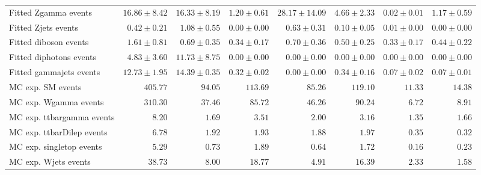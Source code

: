 \begin{table}
\begin{center}
{\begin{tabular*}{\textwidth}{@{\extracolsep{\fill}}lrrrrrrr}
        Fitted Zgamma events         & $16.86 \pm 8.42$          & $16.33 \pm 8.19$          & $1.20 \pm 0.61$          & $28.17 \pm 14.09$          & $4.66 \pm 2.33$          & $0.02 \pm 0.01$          & $1.17 \pm 0.59$              \\
        Fitted Zjets events         & $0.42 \pm 0.21$          & $1.08 \pm 0.55$          & $0.00 \pm 0.00$          & $0.63 \pm 0.31$          & $0.10 \pm 0.05$          & $0.01 \pm 0.00$          & $0.00 \pm 0.00$              \\
        Fitted diboson events         & $1.61 \pm 0.81$          & $0.69 \pm 0.35$          & $0.34 \pm 0.17$          & $0.70 \pm 0.36$          & $0.50 \pm 0.25$          & $0.33 \pm 0.17$          & $0.44 \pm 0.22$              \\
        Fitted diphotons events         & $4.83 \pm 3.60$          & $11.73 \pm 8.75$          & $0.00 \pm 0.00$          & $0.00 \pm 0.00$          & $0.00 \pm 0.00$          & $0.00 \pm 0.00$          & $0.00 \pm 0.00$              \\
        Fitted gammajets events         & $12.73 \pm 1.95$          & $14.39 \pm 0.35$          & $0.32 \pm 0.02$          & $0.00 \pm 0.00$          & $0.34 \pm 0.16$          & $0.07 \pm 0.02$          & $0.07 \pm 0.01$              \\
 \noalign{\smallskip}\hline\noalign{\smallskip}
MC exp. SM events              & $405.77$          & $94.05$          & $113.69$          & $85.26$          & $119.10$          & $11.33$          & $14.38$              \\
\noalign{\smallskip}\hline\noalign{\smallskip}
        MC exp. Wgamma events         & $310.30$          & $37.46$          & $85.72$          & $46.26$          & $90.24$          & $6.72$          & $8.91$              \\
        MC exp. ttbargamma events         & $8.20$          & $1.69$          & $3.51$          & $2.00$          & $3.16$          & $1.35$          & $1.66$              \\
        MC exp. ttbarDilep events         & $6.78$          & $1.92$          & $1.93$          & $1.88$          & $1.97$          & $0.35$          & $0.32$              \\
        MC exp. singletop events         & $5.29$          & $0.73$          & $1.89$          & $0.64$          & $1.72$          & $0.16$          & $0.23$              \\
        MC exp. Wjets events         & $38.73$          & $8.00$          & $18.77$          & $4.91$          & $16.39$          & $2.33$          & $1.58$              \\

\end{tabular*}}
\end{center}
\end{table}
